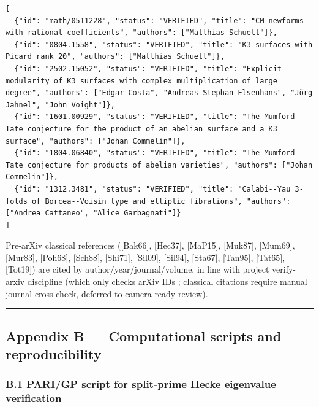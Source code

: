 \documentclass[
  11pt,
  a4paper,
]{amsart}
\begin{document}
\begin{verbatim}
[
  {"id": "math/0511228", "status": "VERIFIED", "title": "CM newforms with rational coefficients", "authors": ["Matthias Schuett"]},
  {"id": "0804.1558", "status": "VERIFIED", "title": "K3 surfaces with Picard rank 20", "authors": ["Matthias Schuett"]},
  {"id": "2502.15052", "status": "VERIFIED", "title": "Explicit modularity of K3 surfaces with complex multiplication of large degree", "authors": ["Edgar Costa", "Andreas-Stephan Elsenhans", "Jörg Jahnel", "John Voight"]},
  {"id": "1601.00929", "status": "VERIFIED", "title": "The Mumford-Tate conjecture for the product of an abelian surface and a K3 surface", "authors": ["Johan Commelin"]},
  {"id": "1804.06840", "status": "VERIFIED", "title": "The Mumford--Tate conjecture for products of abelian varieties", "authors": ["Johan Commelin"]},
  {"id": "1312.3481", "status": "VERIFIED", "title": "Calabi--Yau 3-folds of Borcea--Voisin type and elliptic fibrations", "authors": ["Andrea Cattaneo", "Alice Garbagnati"]}
]
\end{verbatim}

Pre-arXiv classical references ({[}Bak66{]}, {[}Hec37{]}, {[}MaP15{]}, {[}Muk87{]}, {[}Mum69{]}, {[}Mur83{]}, {[}Poh68{]}, {[}Sch88{]}, {[}Shi71{]}, {[}Sil09{]}, {[}Sil94{]}, {[}Sta67{]}, {[}Tan95{]}, {[}Tat65{]}, {[}Tot19{]}) are cited by author/year/journal/volume, in line with project verify-arxiv discipline (which only checks arXiv IDs ; classical citations require manual journal cross-check, deferred to camera-ready review).

\begin{center}\rule{0.5\linewidth}{0.5pt}\end{center}

\hypertarget{appendix-b-computational-scripts-and-reproducibility}{%
\subsection{Appendix B --- Computational scripts and reproducibility}\label{appendix-b-computational-scripts-and-reproducibility}}

\hypertarget{b.1-parigp-script-for-split-prime-hecke-eigenvalue-verification}{%
\subsubsection{B.1 PARI/GP script for split-prime Hecke eigenvalue verification}\label{b.1-parigp-script-for-split-prime-hecke-eigenvalue-verification}}
\end{document}
